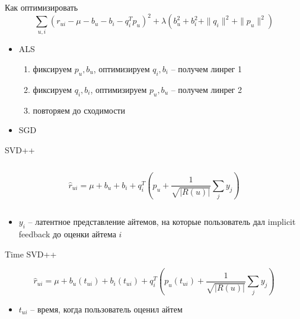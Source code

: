 \documentclass[11pt,aspectratio=169]{beamer}
\begin{document}
\begin{frame}{Как оптимизировать}
\[
\sum_{u, i} (r_{ui} - \mu - b_u - b_i - q_i^T p_u)^2 + \lambda (b_u^2 +  b_i^2 + \| q_i \|^2 + \| p_u \|^2)
\]

\begin{itemize}
\item ALS \cite{IMPLICIT}
\begin{enumerate}
\item фиксируем $p_u, b_u$, оптимизируем $q_i, b_i$ -- получем линрег 1
\item фиксируем  $q_i, b_i$, оптимизируем $p_u, b_u$ -- получем линрег 2
\item повторяем до сходимости
\end{enumerate}
\item SGD
\end{itemize}

\end{frame}

\begin{frame}{SVD++}

\begin{columns}
\begin{column}{0.1\textwidth} 
\end{column}
\begin{column}{0.7\textwidth} 
\begin{tcolorbox}[colback=info!5,colframe=info!80,title=Модель]
\[
\hat r_{ui} = \mu + b_u + b_i + q_i^T \left( p_u + \frac{1}{\sqrt{|R(u)|}} \sum_j y_j \right)
\]
\end{tcolorbox}
\end{column}
\begin{column}{0.1\textwidth} 
\end{column}
\end{columns}

\vfill

\begin{itemize}
\item $y_i$ -- латентное представление айтемов, на которые пользователь дал implicit feedback до оценки айтема $i$
\end{itemize}

\end{frame}

\begin{frame}{Time SVD++}

\begin{tcolorbox}[colback=info!5,colframe=info!80,title=Модель]
\[
\hat r_{ui} = \mu + b_u(t_{ui}) + b_i(t_{ui}) + q_i^T \left( p_u(t_{ui}) + \frac{1}{\sqrt{|R(u)|}} \sum_j y_j \right)
\]
\end{tcolorbox}

\vfill

\begin{itemize}
\item $t_{ui}$ -- время, когда пользователь оценил айтем
\end{itemize}

\end{frame}
\end{document}
